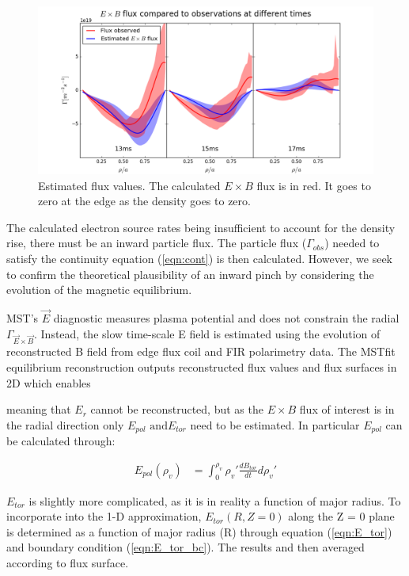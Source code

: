 \documentclass[aip, pop, preprint]{revtex4-1}
\begin{document}
\begin{figure}
	\centering
	\includegraphics[width=0.95\linewidth]{./plots/flux_comp}
	\caption{Estimated flux values. The calculated $ E\times B $ flux is in red. It goes to zero at the edge as the density goes to zero.}
	\label{fig:flux_compare}


\end{figure}

The calculated electron source rates being insufficient to account for the
density rise, there must be an inward particle flux. The particle flux
($\Gamma_{obs}$) needed to satisfy the continuity equation (\ref{eqn:cont}) is
then calculated. However, we seek to confirm the theoretical plausibility of an
inward pinch by considering the evolution of the magnetic equilibrium.

MST's $\vec{E}$ diagnostic measures plasma potential and does not constrain the
radial $\Gamma_{\vec{E} \times \vec{B}}$. Instead, the slow time-scale E field
is estimated using the evolution of reconstructed B field from edge flux coil
and FIR polarimetry data. The MSTfit equilibrium reconstruction outputs
reconstructed flux values and flux surfaces in 2D which enables 

meaning that $ E_r $ cannot be reconstructed, but as the $ E \times B $ flux of
interest is in the radial direction only $ E_{pol} \text{ and} E_{tor} $ need
to be estimated. In particular $E_{pol}$ can be calculated through:

\begin{align}
E_{pol}(\rho_v) & = \int_{0}^{\rho_v}\rho_v' \frac{dB_{tor}}{dt} d\rho_v'
\end{align}


$E_{tor}$ is slightly more complicated, as it is in reality a function of major
radius. To incorporate into the 1-D approximation, $E_{tor}(R, Z=0)$ along the
Z = 0 plane is determined as a function of major radius (R) through equation
(\ref{eqn:E_tor}) and boundary condition (\ref{eqn:E_tor_bc}). The results and
then averaged according to flux surface. 
\end{document}
